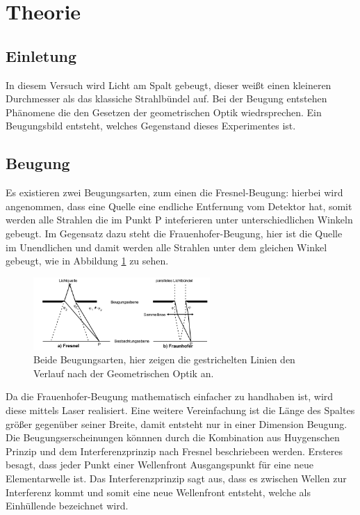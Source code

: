 \section{Theorie}
\label{sec:Theorie}

\subsection{Einletung}
In diesem Versuch wird Licht am Spalt gebeugt, dieser weißt einen kleineren Durchmesser als das klassiche
Strahlbündel auf. Bei der Beugung entstehen Phänomene die den Gesetzen der geometrischen Optik wiedrsprechen.
Ein Beugungsbild entsteht, welches Gegenstand dieses Experimentes ist.

\subsection{Beugung}
Es existieren zwei Beugungsarten, zum einen die Fresnel-Beugung: hierbei wird angenommen, dass eine
Quelle eine endliche Entfernung vom Detektor hat, somit werden alle Strahlen die im Punkt P inteferieren
unter unterschiedlichen Winkeln gebeugt. Im Gegensatz dazu steht die Frauenhofer-Beugung, hier ist
die Quelle im Unendlichen und damit werden alle Strahlen unter dem gleichen Winkel gebeugt, wie in Abbildung
\ref{fig:BA} zu sehen.
 \begin{figure}
  \centering
  \includegraphics[width=0.6\textwidth]{BA.PNG}
  \caption{Beide Beugungsarten, hier zeigen die gestrichelten Linien den Verlauf nach der Geometrischen Optik an.\cite{sample}}
  \label{fig:BA}
\end{figure}
Da die Frauenhofer-Beugung mathematisch einfacher zu handhaben ist, wird diese mittels Laser realisiert.
Eine weitere Vereinfachung ist die Länge des Spaltes größer gegenüber seiner Breite, damit entsteht nur
in einer Dimension Beugung.
Die Beugungserscheinungen könnnen durch die Kombination aus Huygenschen Prinzip und dem Interferenzprinzip nach Fresnel beschriebeen werden.
Ersteres besagt, dass jeder Punkt einer Wellenfront Ausgangspunkt für eine neue Elementarwelle ist.
Das Interferenzprinzip sagt aus, dass es zwischen Wellen zur Interferenz kommt und somit eine neue Wellenfront
entsteht, welche als Einhüllende bezeichnet wird.
